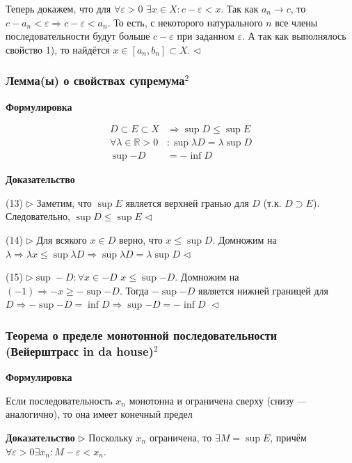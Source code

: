 \documentclass{article}
\def\dbl{\,\,}
\begin{document}
Теперь докажем, что для $\forall \varepsilon > 0 \dbl \exists x \in X : c - \varepsilon < x$. Так как $a_n \rightarrow c$, то $c - a_n < \varepsilon \Rightarrow c - \varepsilon < a_n$. То есть, с некоторого натурального $n$ все члены последовательности будут больше $c - \varepsilon$ при заданном $\varepsilon$. А так как выполнялось свойство 1), то найдётся $x \in [a_n, b_n] \subset X$.
$\lhd$

\subsubsection{Лемма(ы) о свойствах супремума\texorpdfstring{$^2$}{}}

\textbf{Формулировка}

\begin{align}
    D \subset E \subset X &\Rightarrow \sup D \le \sup E\\
    \forall \lambda \in \mathbb{R} > 0&: \sup{\lambda D} = \lambda \sup D\\
    \sup {-D} &= -\inf{D}
\end{align}

\textbf{Доказательство}

(13) $\rhd$ Заметим, что $\sup E$ является верхней гранью для $D$ (т.к. $D \supset E$). Следовательно, $\sup D \le \sup E$ $\lhd$

(14) $\rhd$ Для всякого $x \in D$ верно, что $x \le \sup D$. Домножим на $\lambda \Rightarrow \lambda x \le \sup \lambda D \Rightarrow \sup{\lambda D} = \lambda \sup{D}$ $\lhd$

(15) $\rhd \sup -D : \forall x \in -D \dbl x \le \sup{-D}$. Домножим на $(-1) \Rightarrow -x \ge -\sup{-D}$. Тогда $-\sup{-D}$ является нижней границей для $D \Rightarrow -\sup{-D}=\inf{D} \Rightarrow \sup{-D}=-\inf{D} \dbl \lhd$

\subsubsection{Теорема о пределе монотонной последовательности\texorpdfstring{\\}{}(Вейерштрасс in da house)\texorpdfstring{$^2$}{}}

\textbf{Формулировка}

Если последовательность $x_n$ монотонна и ограничена сверху (снизу --- аналогично), то она имеет конечный предел

\textbf{Доказательство}
$\rhd$
Поскольку $x_n$ ограничена, то $\exists M = \sup E$, причём $\forall \varepsilon > 0 \exists x_n : M - \varepsilon < x_n$.
\end{document}
